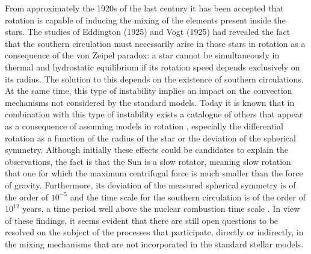 \documentclass[fleqn,usenatbib]{mnras}
\begin{document}
From approximately the 1920s of the last century it has been accepted that rotation is capable of inducing the mixing of the elements present inside the stars. The studies of Eddington (1925) and Vogt (1925) had revealed the fact that the southern circulation must necessarily arise in those stars in rotation as a consequence of the von Zeipel paradox: a star cannot be simultaneously in thermal and hydrostatic equilibrium if its rotation speed depends exclusively on its radius. The solution to this depends on the existence of southern circulations. At the same time, this type of instability implies an impact on the convection mechanisms not considered by the standard models. Today it is known that in combination with this type of instability exists a catalogue of others that appear as a consequence of assuming models in rotation \citep{Maeder2003a}, especially the differential rotation as a function of the radius of the star or the deviation of the spherical symmetry. Although initially these effects could be candidates to explain the observations, the fact is that the Sun is a slow rotator, meaning slow rotation that one for which the maximum centrifugal force is much smaller than the force of gravity. Furthermore, its deviation of the measured spherical symmetry is of the order of $10^{-5}$ and the time scale for the southern circulation is of the order of $10^{12}$ years, a time period well above the nuclear combustion time scale \citep{Pinsonneault1997}. In view of these findings, it seems evident that there are still open questions to be resolved on the subject of the processes that participate, directly or indirectly, in the mixing mechanisms that are not incorporated in the standard stellar models.\par
\end{document}
